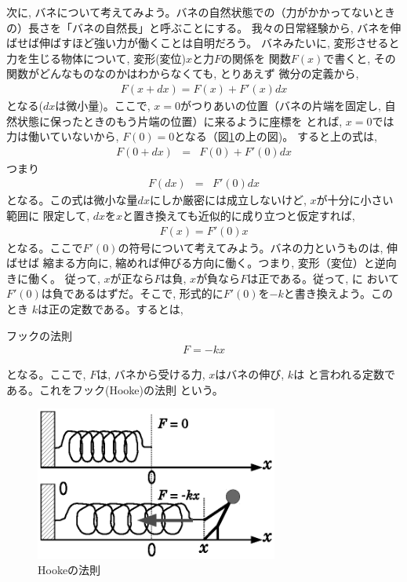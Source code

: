 次に, バネについて考えてみよう。バネの自然状態での（力がかかってないときの）長さを「バネの自然長」と呼ぶことにする。
我々の日常経験から, バネを伸ばせば伸ばすほど強い力が働くことは自明だろう。
バネみたいに, 変形させると力を生じる物体について, 変形(変位)$x$と力$F$の関係を
関数$F(x)$で書くと, その関数がどんなものなのかはわからなくても, とりあえず
微分の定義から, 
\begin{eqnarray}F(x+dx)=F(x)+F'(x)dx\end{eqnarray}
となる($dx$は微小量)。ここで, $x=0$がつりあいの位置（バネの片端を固定し, 
自然状態に保ったときのもう片端の位置）に来るように座標を
とれば, $x=0$では力は働いていないから, $F(0)=0$となる（図\ref{fig:spring}の上の図)。
すると上の式は, 
\begin{eqnarray}
F(0+dx)&=&F(0)+F'(0)dx
\end{eqnarray}
つまり
\begin{eqnarray}
F(dx)&=&F'(0)dx
\end{eqnarray}
となる。この式は微小な量$dx$にしか厳密には成立しないけど, $x$が十分に小さい範囲に
限定して, $dx$を$x$と置き換えても近似的に成り立つと仮定すれば, 
\begin{eqnarray}
F(x)=F'(0)x\label{eq:HookeLaw3}
\end{eqnarray}
となる。ここで$F'(0)$の符号について考えてみよう。バネの力というものは, 伸ばせば
縮まる方向に, 縮めれば伸びる方向に働く。つまり, 変形（変位）と逆向きに働く。
従って, $x$が正なら$F$は負, $x$が負なら$F$は正である。従って, に
おいて$F'(0)$は負であるはずだ。そこで, 形式的に$F'(0)$を$-k$と書き換えよう。このとき
$k$は正の定数である。するとは, 
\begin{itembox}{フックの法則}
\begin{eqnarray}
F=-kx\label{eq:Hooke}
\end{eqnarray}
\end{itembox}
となる。ここで, $F$は, バネから受ける力, $x$はバネの伸び, $k$は
と言われる定数である。これをフック(Hooke)の法則
という。
\begin{figure}[h]
    \centering
    \includegraphics[width=8cm]{spring.eps}
    \caption{Hookeの法則}\label{fig:spring}
\end{figure}

